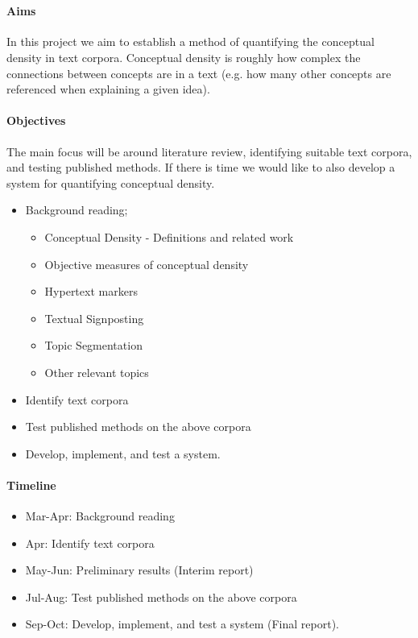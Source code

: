 \documentclass[12pt]{article}
\begin{document}
 \\

\paragraph{Aims}
In this project we aim to establish a method of quantifying the conceptual density in text corpora. Conceptual density is roughly how complex the connections between concepts are in a text (e.g. how many other concepts are referenced when explaining a given idea).

\paragraph{Objectives}
The main focus will be around literature review, identifying suitable text corpora, and testing published methods. If there is time we would like to also develop a system for quantifying conceptual density.
\begin{itemize}[noitemsep]
\item Background reading; 

	\begin{itemize}[noitemsep]
		\item Conceptual Density - Definitions and related work
		\item Objective measures of conceptual density
		\item Hypertext markers
		\item Textual Signposting
		\item Topic Segmentation
		\item Other relevant topics
	\end{itemize}

\item Identify text corpora
\item Test published methods on the above corpora
\item Develop, implement, and test a system.
\end{itemize}

\paragraph{Timeline} 
\begin{itemize}[noitemsep]
\item Mar-Apr: Background reading
\item Apr: Identify text corpora
\item May-Jun: Preliminary results (Interim report)
\item Jul-Aug: Test published methods on the above corpora
\item Sep-Oct: Develop, implement, and test a system (Final report).
\end{itemize}
\end{document}
